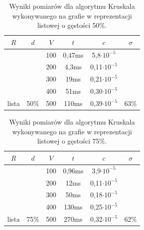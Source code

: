 \documentclass[a4paper,12pt]{article}
\begin{document}
\begin{table}[H]
	\centering
	\caption{\centering Wyniki pomiarów dla algorytmu Kruskala wykonywanego na grafie w reprezentacji listowej o gęstości 50\%.}
	\begin{tabular}{|c|c|c|c|c|c|}
		\hline
		\rowcolor[HTML]{C0C0C0} 
		$R$                     & $d$                    & $V$ & $t$    & $c$                 & $\sigma$               \\ \hline
		&                        & 100 & 0,47ms & 5,8$\cdot 10^{-5}$  &                        \\ \cline{3-5}
		&                        & 200 & 4,3ms  & 0,11$\cdot 10^{-5}$ &                        \\ \cline{3-5}
		&                        & 300 & 19ms   & 0,21$\cdot 10^{-5}$ &                        \\ \cline{3-5}
		&                        & 400 & 51ms   & 0,30$\cdot 10^{-5}$ &                        \\ \cline{3-5}
		\multirow{-5}{*}{lista} & \multirow{-5}{*}{50\%} & 500 & 110ms  & 0,39$\cdot 10^{-5}$ & \multirow{-5}{*}{63\%} \\ \hline
	\end{tabular}
\end{table}

\begin{table}[H]
	\centering
	\caption{\centering Wyniki pomiarów dla algorytmu Kruskala wykonywanego na grafie w reprezentacji listowej o gęstości 75\%.}
	\begin{tabular}{|c|c|c|c|c|c|}
		\hline
		\rowcolor[HTML]{C0C0C0} 
		$R$                     & $d$                    & $V$ & $t$    & $c$                 & $\sigma$               \\ \hline
		&                        & 100 & 0,96ms & 3,9$\cdot 10^{-5}$  &                        \\ \cline{3-5}
		&                        & 200 & 12ms   & 0,11$\cdot 10^{-5}$ &                        \\ \cline{3-5}
		&                        & 300 & 50ms   & 0,18$\cdot 10^{-5}$ &                        \\ \cline{3-5}
		&                        & 400 & 130ms  & 0,25$\cdot 10^{-5}$ &                        \\ \cline{3-5}
		\multirow{-5}{*}{lista} & \multirow{-5}{*}{75\%} & 500 & 270ms  & 0,32$\cdot 10^{-5}$ & \multirow{-5}{*}{62\%} \\ \hline
	\end{tabular}
\end{table}
\end{document}
